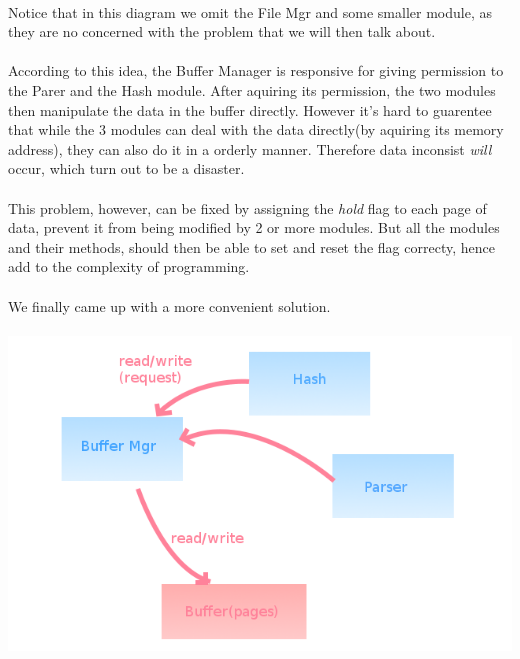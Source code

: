 \documentclass[a4paper, 12pt]{article}
\begin{document}
        \paragraph{}
            Notice that in this diagram we omit the File Mgr and some smaller module, as they are no concerned with the problem that we will then talk about.
        \paragraph{}
            According to this idea, the Buffer Manager is responsive for giving permission to the Parer and the Hash module. After aquiring its permission, the two modules then manipulate the data in the buffer directly. However it's hard to guarentee that while the 3 modules can deal with the data directly(by aquiring its memory address), they can also do it in a orderly manner. Therefore data inconsist \emph{will} occur, which turn out to be a disaster.
        \paragraph{}
            This problem, however, can be fixed by assigning the \emph{hold} flag to each page of data, prevent it from being modified by 2 or more modules. But all the modules and their methods, should then be able to set and reset the flag correcty, hence add to the complexity of programming.
        \paragraph{}
            We finally came up with a more convenient solution.
        \paragraph{} \includegraphics[scale=0.5]{img/arch2.png}
\end{document}
